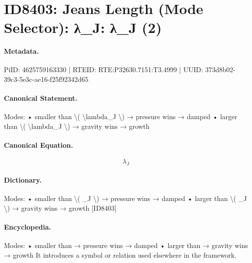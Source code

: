 \section*{ID8403: Jeans Length (Mode Selector): λ\_J: λ\_J (2)}
\paragraph{Metadata.}
PiID: 4625759163330 | RTEID: RTE:P32630.7151:T3.4999 | UUID: 373d8b02-39c3-5e3c-ae16-f25f92342d65

\paragraph{Canonical Statement.}
Modes: • smaller than \textbackslash{}( \textbackslash{}lambda\_J \textbackslash{}) → pressure wins → damped • larger than \textbackslash{}( \textbackslash{}lambda\_J \textbackslash{}) → gravity wins → growth

\paragraph{Canonical Equation.}
\[
\lambda_J
\]

\paragraph{Dictionary.}
Modes: • smaller than \textbackslash{}( \_J \textbackslash{}) → pressure wins → damped • larger than \textbackslash{}( \_J \textbackslash{}) → gravity wins → growth [ID8403]

\paragraph{Encyclopedia.}
Modes: • smaller than → pressure wins → damped • larger than → gravity wins → growth It introduces a symbol or relation used elsewhere in the framework.

